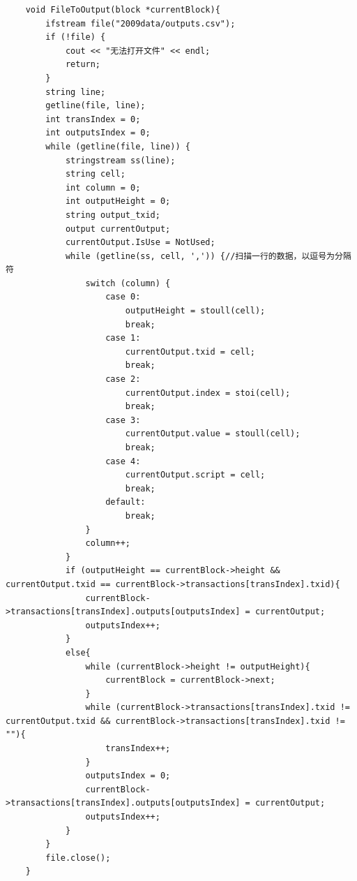 \documentclass[10pt,a4paper]{article}
\begin{document}
\begin{verbatim}
    void FileToOutput(block *currentBlock){
        ifstream file("2009data/outputs.csv");
        if (!file) {
            cout << "无法打开文件" << endl;
            return;
        }
        string line;
        getline(file, line);
        int transIndex = 0;
        int outputsIndex = 0;
        while (getline(file, line)) {
            stringstream ss(line);
            string cell;
            int column = 0;
            int outputHeight = 0;
            string output_txid;
            output currentOutput;
            currentOutput.IsUse = NotUsed;
            while (getline(ss, cell, ',')) {//扫描一行的数据，以逗号为分隔符
                switch (column) {
                    case 0:
                        outputHeight = stoull(cell);
                        break;
                    case 1:
                        currentOutput.txid = cell;
                        break;
                    case 2:
                        currentOutput.index = stoi(cell);
                        break;
                    case 3:
                        currentOutput.value = stoull(cell);
                        break;
                    case 4:
                        currentOutput.script = cell;
                        break;
                    default:
                        break;
                }
                column++;
            }
            if (outputHeight == currentBlock->height && currentOutput.txid == currentBlock->transactions[transIndex].txid){
                currentBlock->transactions[transIndex].outputs[outputsIndex] = currentOutput;
                outputsIndex++;
            }
            else{
                while (currentBlock->height != outputHeight){
                    currentBlock = currentBlock->next;
                }
                while (currentBlock->transactions[transIndex].txid != currentOutput.txid && currentBlock->transactions[transIndex].txid != ""){
                    transIndex++;
                }
                outputsIndex = 0;
                currentBlock->transactions[transIndex].outputs[outputsIndex] = currentOutput;
                outputsIndex++;
            }
        }
        file.close();
    }
    

\end{verbatim}
\end{document}
